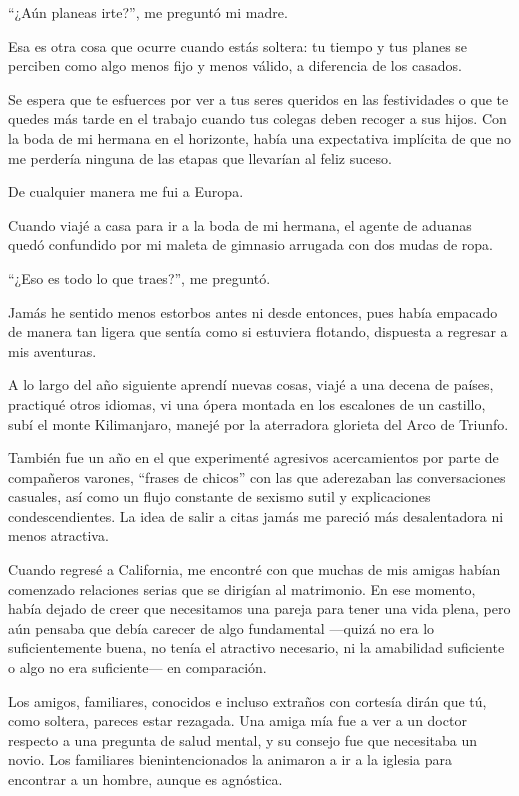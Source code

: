 ``¿Aún planeas irte?'', me preguntó mi madre.

Esa es otra cosa que ocurre cuando estás soltera: tu tiempo y tus planes
se perciben como algo menos fijo y menos válido, a diferencia de los
casados.

Se espera que te esfuerces por ver a tus seres queridos en las
festividades o que te quedes más tarde en el trabajo cuando tus colegas
deben recoger a sus hijos. Con la boda de mi hermana en el horizonte,
había una expectativa implícita de que no me perdería ninguna de las
etapas que llevarían al feliz suceso.

De cualquier manera me fui a Europa.

Cuando viajé a casa para ir a la boda de mi hermana, el agente de
aduanas quedó confundido por mi maleta de gimnasio arrugada con dos
mudas de ropa.

``¿Eso es todo lo que traes?'', me preguntó.

Jamás he sentido menos estorbos antes ni desde entonces, pues había
empacado de manera tan ligera que sentía como si estuviera flotando,
dispuesta a regresar a mis aventuras.

A lo largo del año siguiente aprendí nuevas cosas, viajé a una decena de
países, practiqué otros idiomas, vi una ópera montada en los escalones
de un castillo, subí el monte Kilimanjaro, manejé por la aterradora
glorieta del Arco de Triunfo.

También fue un año en el que experimenté agresivos acercamientos por
parte de compañeros varones, ``frases de chicos'' con las que aderezaban
las conversaciones casuales, así como un flujo constante de sexismo
sutil y explicaciones condescendientes. La idea de salir a citas jamás
me pareció más desalentadora ni menos atractiva.

Cuando regresé a California, me encontré con que muchas de mis amigas
habían comenzado relaciones serias que se dirigían al matrimonio. En ese
momento, había dejado de creer que necesitamos una pareja para tener una
vida plena, pero aún pensaba que debía carecer de algo fundamental
---quizá no era lo suficientemente buena, no tenía el atractivo
necesario, ni la amabilidad suficiente o algo no era suficiente--- en
comparación.

Los amigos, familiares, conocidos e incluso extraños con cortesía dirán
que tú, como soltera, pareces estar rezagada. Una amiga mía fue a ver a
un doctor respecto a una pregunta de salud mental, y su consejo fue que
necesitaba un novio. Los familiares bienintencionados la animaron a ir a
la iglesia para encontrar a un hombre, aunque es agnóstica.

